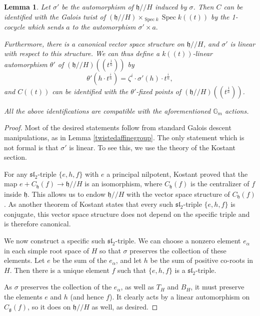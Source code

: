 \documentclass[12pt]{article}
\DeclareMathOperator{\Spec}{Spec}
\newtheorem{lemma}[theorem]{Lemma}
\theoremstyle{remark}
\begin{document}
\begin{lemma}\label{explicitcenter}
Let $\sigma'$ be the automorphism of $\mathfrak{h}//H$ induced by $\sigma$. Then $C$ can be identified with the Galois twist of $(\mathfrak{h}//H)\times_{\Spec k}\Spec k((t))$ by the 1-cocycle which sends $a$ to the automorphism $\sigma'\times a.$

Furthermore, there is a canonical vector space structure on $\mathfrak{h}//H$, and $\sigma'$ is linear with respect to this structure. We can thus define a $k((t))$-linear automorphism $\theta'$ of $(\mathfrak{h}//H)((t^{\frac{1}{n}}))$ by
\[
\theta'(h\cdot t^{\frac{i}{n}})=\zeta^{i}\cdot\sigma'(h)\cdot t^{\frac{i}{n}},
\]
and $C((t))$ can be identified with the $\theta'$-fixed points of $(\mathfrak{h}//H)((t^{\frac{1}{n}}))$. 

All the above identifications are compatible with the aforementioned $\mathbb{G}_m$ actions.
\end{lemma}

\begin{proof}
Most of the desired statements follow from standard Galois descent manipulations, as in Lemma \ref{twistedaffinegroup}. The only statement which is not formal is that $\sigma'$ is linear. To see this, we use the theory of the Kostant section.

For any $\mathfrak{sl}_2$-triple $\{e,h,f\}$ with $e$ a principal nilpotent, Kostant \cite{kostant} proved that the map $e+C_{\mathfrak{h}}(f)\rightarrow\mathfrak{h}//H$ is an isomorphism, where $C_{\mathfrak{h}}(f)$ is the centralizer of $f$ inside $\mathfrak{h}$. This allows us to endow $\mathfrak{h}//H$ with the vector space structure of $C_{\mathfrak{h}}(f)$. As another theorem of Kostant \cite{kostantuniqueness} states that every such $\mathfrak{sl}_2$-triple $\{e,h,f\}$ is conjugate, this vector space structure does not depend on the specific triple and is therefore canonical.

We now construct a specific such $\mathfrak{sl}_2$-triple. We can choose a nonzero element $e_{\alpha}$ in each simple root space of $H$ so that $\sigma$ preserves the collection of these elements. Let $e$ be the sum of the $e_{\alpha}$, and let $h$ be the sum of positive co-roots in $H$. Then there is a unique element $f$ such that $\{e,h,f\}$ is a $\mathfrak{sl}_2$-triple.

As $\sigma$ preserves the collection of the $e_{\alpha}$, as well as $T_H$ and $B_H$, it must preserve the elements $e$ and $h$ (and hence $f$). It clearly acts by a linear automorphism on $C_{\mathfrak{g}}(f)$, so it does on $\mathfrak{h}//H$ as well, as desired.
\end{proof}
\end{document}
